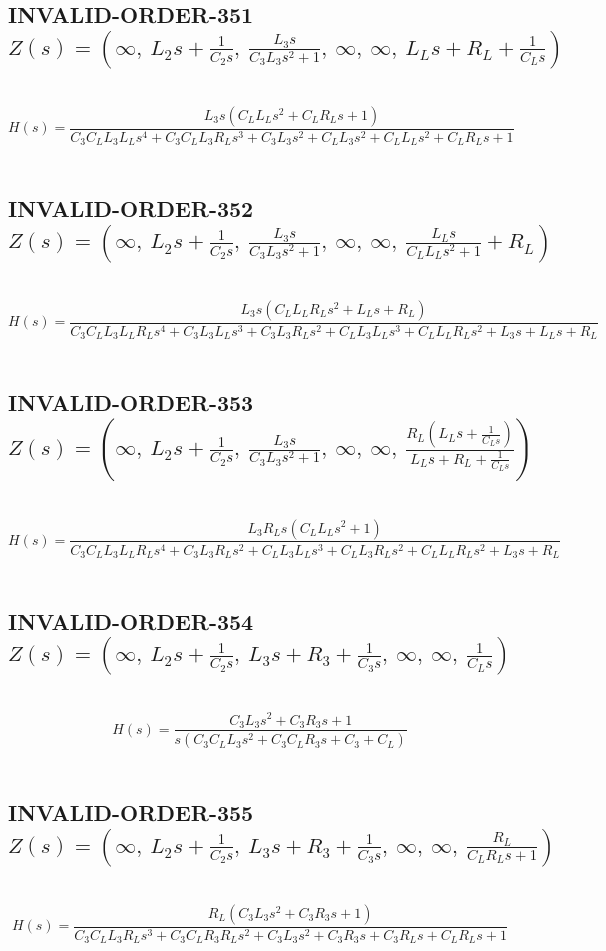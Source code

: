 \documentclass{article}
\begin{document}
\subsection{INVALID-ORDER-351 $Z(s) = \left( \infty, \  L_{2} s + \frac{1}{C_{2} s}, \  \frac{L_{3} s}{C_{3} L_{3} s^{2} + 1}, \  \infty, \  \infty, \  L_{L} s + R_{L} + \frac{1}{C_{L} s}\right)$ } \ 
\textbf{\[H(s) = \frac{L_{3} s \left(C_{L} L_{L} s^{2} + C_{L} R_{L} s + 1\right)}{C_{3} C_{L} L_{3} L_{L} s^{4} + C_{3} C_{L} L_{3} R_{L} s^{3} + C_{3} L_{3} s^{2} + C_{L} L_{3} s^{2} + C_{L} L_{L} s^{2} + C_{L} R_{L} s + 1}\] } \ 
\subsection{INVALID-ORDER-352 $Z(s) = \left( \infty, \  L_{2} s + \frac{1}{C_{2} s}, \  \frac{L_{3} s}{C_{3} L_{3} s^{2} + 1}, \  \infty, \  \infty, \  \frac{L_{L} s}{C_{L} L_{L} s^{2} + 1} + R_{L}\right)$ } \ 
\textbf{\[H(s) = \frac{L_{3} s \left(C_{L} L_{L} R_{L} s^{2} + L_{L} s + R_{L}\right)}{C_{3} C_{L} L_{3} L_{L} R_{L} s^{4} + C_{3} L_{3} L_{L} s^{3} + C_{3} L_{3} R_{L} s^{2} + C_{L} L_{3} L_{L} s^{3} + C_{L} L_{L} R_{L} s^{2} + L_{3} s + L_{L} s + R_{L}}\] } \ 
\subsection{INVALID-ORDER-353 $Z(s) = \left( \infty, \  L_{2} s + \frac{1}{C_{2} s}, \  \frac{L_{3} s}{C_{3} L_{3} s^{2} + 1}, \  \infty, \  \infty, \  \frac{R_{L} \left(L_{L} s + \frac{1}{C_{L} s}\right)}{L_{L} s + R_{L} + \frac{1}{C_{L} s}}\right)$ } \ 
\textbf{\[H(s) = \frac{L_{3} R_{L} s \left(C_{L} L_{L} s^{2} + 1\right)}{C_{3} C_{L} L_{3} L_{L} R_{L} s^{4} + C_{3} L_{3} R_{L} s^{2} + C_{L} L_{3} L_{L} s^{3} + C_{L} L_{3} R_{L} s^{2} + C_{L} L_{L} R_{L} s^{2} + L_{3} s + R_{L}}\] } \ 
\subsection{INVALID-ORDER-354 $Z(s) = \left( \infty, \  L_{2} s + \frac{1}{C_{2} s}, \  L_{3} s + R_{3} + \frac{1}{C_{3} s}, \  \infty, \  \infty, \  \frac{1}{C_{L} s}\right)$ } \ 
\textbf{\[H(s) = \frac{C_{3} L_{3} s^{2} + C_{3} R_{3} s + 1}{s \left(C_{3} C_{L} L_{3} s^{2} + C_{3} C_{L} R_{3} s + C_{3} + C_{L}\right)}\] } \ 
\subsection{INVALID-ORDER-355 $Z(s) = \left( \infty, \  L_{2} s + \frac{1}{C_{2} s}, \  L_{3} s + R_{3} + \frac{1}{C_{3} s}, \  \infty, \  \infty, \  \frac{R_{L}}{C_{L} R_{L} s + 1}\right)$ } \ 
\textbf{\[H(s) = \frac{R_{L} \left(C_{3} L_{3} s^{2} + C_{3} R_{3} s + 1\right)}{C_{3} C_{L} L_{3} R_{L} s^{3} + C_{3} C_{L} R_{3} R_{L} s^{2} + C_{3} L_{3} s^{2} + C_{3} R_{3} s + C_{3} R_{L} s + C_{L} R_{L} s + 1}\] } \ 
\end{document}
